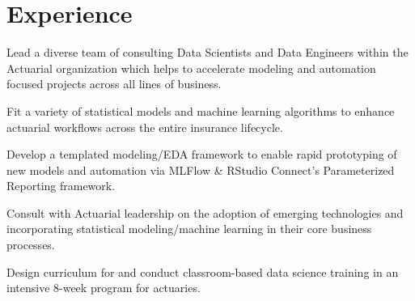 \documentclass[letterpaper]{deedy-resume} %
\begin{document}
\begin{minipage}[t]{0.65\textwidth} %


\section{Experience}
\hfill{}
\hfill
{}
\vspace{\topsep}
\begin{tightitemize}
\item Lead a diverse team of consulting Data Scientists and Data Engineers
  within the Actuarial organization which helps to accelerate modeling and
  automation focused projects across all lines of business.  
\item Fit a variety of statistical models and machine learning algorithms to enhance
  actuarial workflows across the entire insurance lifecycle.
\item Develop a templated modeling/EDA framework to enable rapid prototyping
  of new models and automation via MLFlow \& RStudio Connect's Parameterized
  Reporting framework.
\item Consult with Actuarial leadership on the adoption of emerging technologies
  and incorporating statistical modeling/machine learning in their core business
  processes.   
\item Design curriculum for and conduct classroom-based data science training in an intensive
  8-week program for actuaries.
\end{tightitemize}
\sectionspace


\end{minipage}
\end{document}
